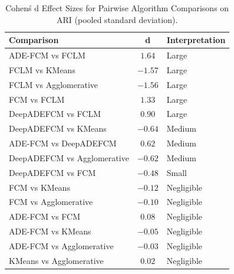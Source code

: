 \begin{table}[ht]
\centering
\caption{Cohen\'s d Effect Sizes for Pairwise Algorithm Comparisons on ARI (pooled standard deviation).}
\label{tab:effects}
\begin{tabular}{lcl}
\toprule
Comparison & d & Interpretation \\
\midrule
ADE-FCM vs FCLM & $1.64$ & Large \\
FCLM vs KMeans & $-1.57$ & Large \\
FCLM vs Agglomerative & $-1.56$ & Large \\
FCM vs FCLM & $1.33$ & Large \\
DeepADEFCM vs FCLM & $0.90$ & Large \\
DeepADEFCM vs KMeans & $-0.64$ & Medium \\
ADE-FCM vs DeepADEFCM & $0.62$ & Medium \\
DeepADEFCM vs Agglomerative & $-0.62$ & Medium \\
DeepADEFCM vs FCM & $-0.48$ & Small \\
FCM vs KMeans & $-0.12$ & Negligible \\
FCM vs Agglomerative & $-0.10$ & Negligible \\
ADE-FCM vs FCM & $0.08$ & Negligible \\
ADE-FCM vs KMeans & $-0.05$ & Negligible \\
ADE-FCM vs Agglomerative & $-0.03$ & Negligible \\
KMeans vs Agglomerative & $0.02$ & Negligible \\
\bottomrule
\end{tabular}
\end{table}
